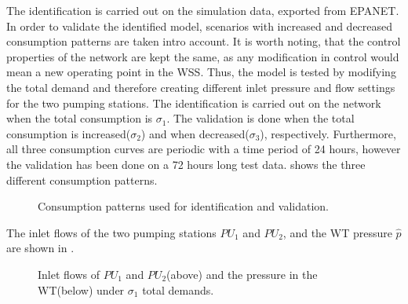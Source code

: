 The identification is carried out on the simulation data, exported from EPANET. In order to validate the identified model, scenarios with increased and decreased consumption patterns are taken intro account. It is worth noting, that the control properties of the network are kept the same, as any modification in control would mean a new operating point in the WSS. Thus, the model is tested by modifying the total demand and therefore creating different inlet pressure and flow settings for the two pumping stations. The identification is carried out on the network when the total consumption is $\sigma_1$. The validation is done when the total consumption is increased($\sigma_2$) and when decreased($\sigma_3$), respectively. Furthermore, all three consumption curves are periodic with a time period of 24 hours, however the validation has been done on a 72 hours long test data.  shows the three different consumption patterns.

 \begin{figure}[H]
 \centering
  
 \vspace{-2.5mm}
 \caption{Consumption patterns used for identification and validation.}
 \label{fig:sigma123}
 \end{figure}

 \vspace{-3mm}

 The inlet flows of the two pumping stations $PU_1$ and $PU_2$, and the WT pressure $\hat{p}$ are shown in . 

 \vspace{-3mm}

 \begin{figure}[H]
 \centering
  
 \vspace{-2.5mm}
 \label{fig:dk_sigma1}
 \end{figure}

 \vspace{-6.5mm}

 \begin{figure}[H]
 \centering
 \hspace{-4.5mm}
  
 \vspace{-2.5mm}
 \caption{Inlet flows of $PU_1$ and $PU_2$(above) and the pressure in the WT(below) under $\sigma_1$ total demands.}
 \label{fig:WT_sigma1}
 \end{figure}

